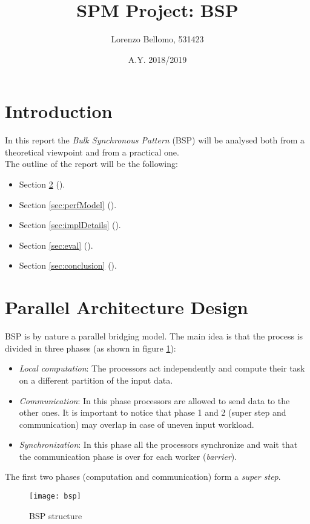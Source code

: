 \documentclass[]{article}
\title{SPM Project: BSP}
\author{Lorenzo Bellomo, 531423}
\date{A.Y. 2018/2019}
\begin{document}
\maketitle

\section{Introduction}

In this report the \emph{Bulk Synchronous Pattern} (BSP) will be analysed both from a theoretical viewpoint and from a practical one. \\
The outline of the report will be the following:
\begin{itemize}
	\item Section \ref{sec:parDesign} ().
	\item Section \ref{sec:perfModel} ().
	\item Section \ref{sec:implDetails} ().
	\item Section \ref{sec:eval} ().
	\item Section \ref{sec:conclusion} ().
\end{itemize}

\section{Parallel Architecture Design}
\label{sec:parDesign}

BSP is by nature a parallel bridging model. The main idea is that the process is divided in three phases (as shown in figure \ref{fig:BSP}):
\begin{itemize}
	\item \emph{Local computation}: The processors act independently and compute their task on a different partition of the input data.
	\item \emph{Communication}: In this phase processors are allowed to send data to the other ones. It is important to notice that phase 1 and 2 (super step and communication) may overlap in case of uneven input workload.
	\item \emph{Synchronization}: In this phase all the processors synchronize and wait that the communication phase is over for each worker (\emph{barrier}).
\end{itemize}
The first two phases (computation and communication) form a \emph{super step}.
\begin{figure}[H]
	\centering
	\texttt{[image: bsp]}
	\caption{BSP structure}
	\label{fig:BSP}
\end{figure}
\end{document}
